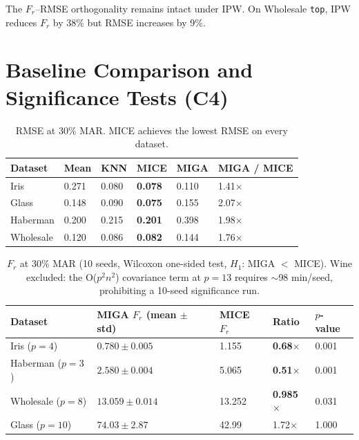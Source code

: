 The $F_r$--RMSE orthogonality remains intact under IPW. On Wholesale \texttt{top}, IPW reduces $F_r$ by 38\% but RMSE increases by 9\%.

\section{Baseline Comparison and Significance Tests (C4)}
\label{sec:significance}

\begin{table}[h]
\caption{RMSE at 30\% MAR. MICE achieves the lowest RMSE on every dataset.}
\label{tab:rmse}
\centering
\begin{tabular}{llllll}
\toprule
\textbf{Dataset} & \textbf{Mean} & \textbf{KNN} & \textbf{MICE} & \textbf{MIGA} & \textbf{MIGA / MICE} \\
\midrule
Iris     & 0.271 & 0.080 & \textbf{0.078} & 0.110 & 1.41$\times$ \\
Glass    & 0.148 & 0.090 & \textbf{0.075} & 0.155 & 2.07$\times$ \\
Haberman & 0.200 & 0.215 & \textbf{0.201} & 0.398 & 1.98$\times$ \\
Wholesale& 0.120 & 0.086 & \textbf{0.082} & 0.144 & 1.76$\times$ \\
\bottomrule
\end{tabular}
\end{table}

\begin{table}[h]
\caption{$F_r$ at 30\% MAR (10 seeds, Wilcoxon one-sided test, $H_1$: MIGA $<$ MICE). Wine excluded: the O($p^2 n^2$) covariance term at $p=13$ requires $\sim$98 min/seed, prohibiting a 10-seed significance run.}
\label{tab:fr}
\centering
\begin{tabular}{lllll}
\toprule
\textbf{Dataset} & \textbf{MIGA $F_r$} (mean $\pm$ std) & \textbf{MICE $F_r$} & \textbf{Ratio} & $p$-value \\
\midrule
Iris ($p=4$)      & $0.780 \pm 0.005$ & 1.155 & \textbf{0.68$\times$} & 0.001 \\
Haberman ($p=3$)  & $2.580 \pm 0.004$ & 5.065 & \textbf{0.51$\times$} & 0.001 \\
Wholesale ($p=8$) & $13.059 \pm 0.014$ & 13.252 & \textbf{0.985$\times$} & 0.031 \\
Glass ($p=10$)    & $74.03 \pm 2.87$  & 42.99 & 1.72$\times$          & 1.000 \\
\bottomrule
\end{tabular}
\end{table}

